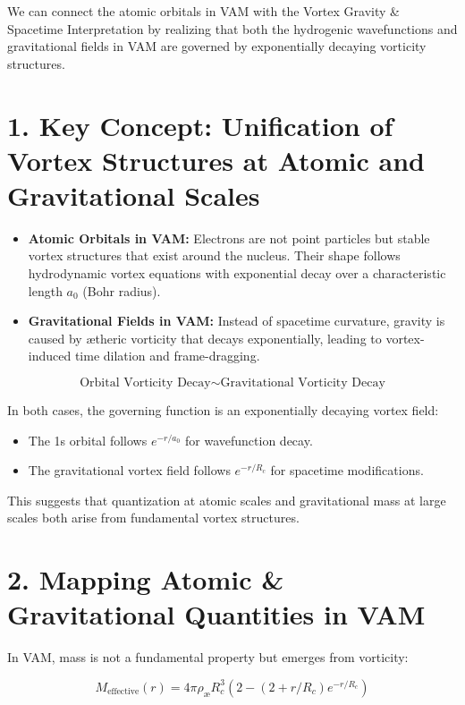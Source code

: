 We can connect the atomic orbitals in VAM with the Vortex Gravity \& Spacetime Interpretation by realizing that both the hydrogenic wavefunctions and gravitational fields in VAM are governed by exponentially decaying vorticity structures.

\section*{1. Key Concept: Unification of Vortex Structures at Atomic and Gravitational Scales}

\begin{itemize}
    \item \textbf{Atomic Orbitals in VAM:} Electrons are not point particles but stable vortex structures that exist around the nucleus. Their shape follows hydrodynamic vortex equations with exponential decay over a characteristic length \(a_0\) (Bohr radius).
    \item \textbf{Gravitational Fields in VAM:} Instead of spacetime curvature, gravity is caused by ætheric vorticity that decays exponentially, leading to vortex-induced time dilation and frame-dragging.
\end{itemize}

\[
\text{Orbital Vorticity Decay} \sim \text{Gravitational Vorticity Decay}
\]

In both cases, the governing function is an exponentially decaying vortex field:

\begin{itemize}
    \item The 1s orbital follows \(e^{-r/a_0}\) for wavefunction decay.
    \item The gravitational vortex field follows \(e^{-r/R_c}\) for spacetime modifications.
\end{itemize}

This suggests that quantization at atomic scales and gravitational mass at large scales both arise from fundamental vortex structures.

\section*{2. Mapping Atomic \& Gravitational Quantities in VAM}

In VAM, mass is not a fundamental property but emerges from vorticity:

\[
M_{\text{effective}}(r) = 4\pi \rho_\text{\ae} R_c^3 \left( 2 - (2 + r/R_c) e^{-r / R_c} \right)
\]

